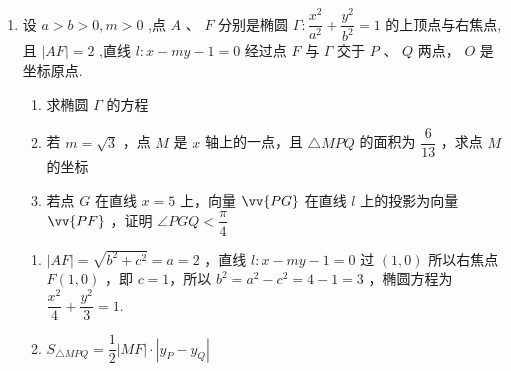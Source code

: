 \begin{enumerate}
\begin{enumerate}
\begin{jieda}
\begin{enumerate}
            \end{enumerate}
        \end{jieda}
        \item 设 $a > b > 0,m > 0$ ,点 $A\text{ 、 }F$ 分别是椭圆 $\Gamma  : \dfrac{{x}^2}{{a}^2} + \dfrac{{y}^2}{{b}^2} = 1$ 的上顶点与右焦点,且 $\left| {AF}\right|  = 2$ ,直线 $l : x - {my} - 1 = 0$ 经过点 $F$ 与 $\Gamma$ 交于 $P$ 、 $Q$ 两点， $O$ 是坐标原点.
        \begin{enumerate}
            \item 求椭圆 $\Gamma$ 的方程
            \item 若 $m = \sqrt{3}$ ，点 $M$ 是 $x$ 轴上的一点，且 $\bigtriangleup  {MPQ}$ 的面积为 $\dfrac{6}{13}$ ，求点 $M$ 的坐标
            \item 若点 $G$ 在直线 $x = 5$ 上，向量 $\vv{PG}$ 在直线 $l$ 上的投影为向量 $\vv{PF}$ ，证明 $\angle {PGQ} < \dfrac{\pi }{4}$
        \end{enumerate}
        \begin{jieda}
            \begin{enumerate}
                \item $\left| {AF}\right|  = \sqrt{{b}^2 + {c}^2} = a = 2$ ，直线 $l : x - {my} - 1 = 0$ 过 $\left( {1,0}\right)$ 所以右焦点 $F\left( {1,0}\right)$ ，即 $c = 1$，所以 ${b}^2 = {a}^2 - {c}^2 = 4 - 1 = 3$ ，椭圆方程为 $\dfrac{{x}^2}{4} + \dfrac{{y}^2}{3} = 1$.
                \item $S_{\triangle MPQ} = \dfrac{1}{2}|MF|\cdot |y_P - y_Q|$
                

\end{enumerate}
\end{jieda}
\end{enumerate}
\end{enumerate}
